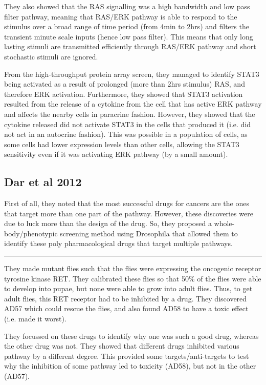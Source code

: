 \documentclass[a4paper,12pt]{article}
\begin{document}
They also showed that the RAS signalling was a high bandwidth and low pass filter pathway, meaning that RAS/ERK pathway is able to respond to the stimulus over a broad range of time period (from 4min to 2hrs) and filters the transient minute scale inputs (hence low pass filter).
This means that only long lasting stimuli are transmitted efficiently through RAS/ERK pathway and short stochastic stimuli are ignored.

From the high-throughput protein array screen, they managed to identify STAT3 being activated as a result of prolonged (more than 2hrs stimulus) RAS, and therefore ERK activation.
Furthermore, they showed that STAT3 activation resulted from the release of a cytokine from the cell that has active ERK pathway and affects the nearby cells in paracrine fashion.
However, they showed that the cytokine released did not activate STAT3 in the cells that produced it (i.e. did not act in an autocrine fashion).
This was possible in a population of cells, as some cells had lower expression levels than other cells, allowing the STAT3 sensitivity even if it was activating ERK pathway (by a small amount).

\subsection*{\normalsize{Dar et al 2012}}

First of all, they noted that the most successful drugs for cancers are the ones that target more than one part of the pathway.
However, these discoveries were due to luck more than the design of the drug.
So, they proposed a whole-body/phenotypic screening method using Drosophila that allowed them to identify these poly pharmacological drugs that target multiple pathways.

\noindent\rule{\textwidth}{0.4pt}

They made mutant flies such that the flies were expressing the oncogenic receptor tyrosine kinase RET.
They calibrated these flies so that 50\% of the flies were able to develop into pupae, but none were able to grow into adult flies.
Thus, to get adult flies, this RET receptor had to be inhibited by a drug.
They discovered AD57 which could rescue the flies, and also found AD58 to have a toxic effect (i.e. made it worst).

They focussed on these drugs to identify why one was such a good drug, whereas the other drug was not.
They showed that different drugs inhibited various pathway by a different degree.
This provided some targets/anti-targets to test why the inhibition of some pathway led to toxicity (AD58), but not in the other (AD57).
\end{document}
